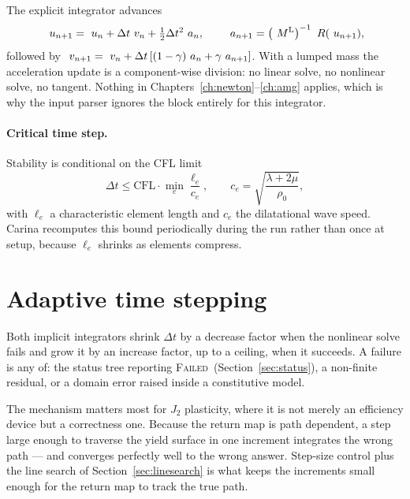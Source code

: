 The explicit integrator advances
\begin{equation}
  ~u_{n+1} = ~u_n + \Delta t ~v_n + \tfrac12 \Delta t^2 ~a_n,
  \qquad
  ~a_{n+1} = \left(~M^{\mathrm{L}}\right)^{-1}~R(~u_{n+1}),
\end{equation}
followed by $~v_{n+1} = ~v_n + \Delta t\left[(1-\gamma)~a_n + \gamma
~a_{n+1}\right]$.  With a lumped mass the acceleration update is a
component-wise division: no linear solve, no nonlinear solve, no tangent.
Nothing in Chapters~\ref{ch:newton}--\ref{ch:amg} applies, which is why the
input parser ignores the  block entirely for this integrator.

\paragraph{Critical time step.}  Stability is conditional on the CFL limit
\begin{equation}
  \Delta t \le \mathrm{CFL} \cdot \min_e \frac{\ell_e}{c_e},
  \qquad c_e = \sqrt{\frac{\lambda + 2\mu}{\rho_0}},
\end{equation}
with $\ell_e$ a characteristic element length and $c_e$ the dilatational wave
speed.  Carina recomputes this bound periodically during the run rather than
once at setup, because $\ell_e$ shrinks as elements compress.

\section{Adaptive time stepping}
\label{sec:adaptive}

Both implicit integrators shrink $\Delta t$ by a decrease factor when the
nonlinear solve fails and grow it by an increase factor, up to a ceiling, when
it succeeds.  A failure is any of: the status tree reporting
\textsc{Failed}~(Section~\ref{sec:status}), a non-finite residual, or a domain
error raised inside a constitutive model.

The mechanism matters most for $J_2$ plasticity, where it is not merely an
efficiency device but a correctness one.  Because the return map is path
dependent, a step large enough to traverse the yield surface in one increment
integrates the wrong path --- and converges perfectly well to the wrong answer.
Step-size control plus the line search of Section~\ref{sec:linesearch} is what
keeps the increments small enough for the return map to track the true path.

